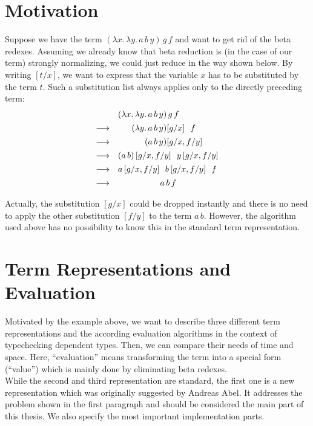 \documentclass[12pt, a4paper, titlepage]{article}
\newcommand{\sspace}{\,}
\newcommand{\lspace}{\ \,}
\newcommand{\shspace}{\vspace{1ex}}
\newcommand{\la}{\lambda}
\newcommand{\ApA}[2]{#1 \sspace #2}
\newcommand{\LaA}[2]{\la {#1}. \sspace #2}
\newcommand{\sub}[2]{\left[ #1 / #2 \right]}
\newcommand{\subs}[4]{\left[ #1 / #2 , #3 / #4 \right]}
\newcommand{\re}{\longrightarrow}
\let\stdsection\section
\renewcommand\section{\newpage\stdsection}
\begin{document}
\thispagestyle{empty}
\tableofcontents
\clearpage

\setcounter{page}{1}

\section{Motivation}

Suppose we have the term $(\LaA x {\LaA y {\ApA{\ApA a b} y}}) \sspace g \sspace f$ and want to get rid of the beta redexes. Assuming we already know that beta reduction is (in the case of our term) strongly normalizing, we could just reduce in the way shown below. By writing $\sub t x$, we want to express that the variable $x$ has to be substituted by the term $t$. Such a substitution list always applies only to the directly preceding term:
\[
\begin{array}{lr@{}l}
\shspace &(\LaA x {\LaA y {\ApA{\ApA a b} y}}) & \sspace g \sspace f \\ 
\shspace\re &(\LaA y {\ApA{\ApA a b} y}) & \sub g x \lspace f \\ 
\shspace\re &      (\ApA{\ApA a b} y) & \subs g x f y \\ 
\shspace\re &      \multicolumn 2 l {(a\sspace b)\subs g x f y \lspace y\subs g x f y} \\ 
\shspace\re &      \multicolumn 2 l {a\subs g x f y \lspace b\subs g x f y \lspace f} \\ 
\shspace\re &      \multicolumn 2 {c} {a \sspace b \sspace f}  \\ 
\end{array}
\]
Actually, the substitution $\sub g x$ could be dropped instantly and there is no need to apply the other substitution $\sub f y$ to the term $\ApA a b$. However, the algorithm used above has no possibility to know this in the standard term representation.


\section{Term Representations and Evaluation}\label{mainsec}

Motivated by the example above, we want to describe three different term representations and the according evaluation 
algorithms in the context of typechecking dependent types. Then, we can compare their needs of time and space. 
Here, ``evaluation'' means transforming the term into a special form (``value'') which is mainly done by eliminating beta redexes.\\
While the second and third representation are standard,
the first one is a new representation which was originally suggested by Andreas Abel. It addresses the problem shown in the first paragraph and should be considered the main part of this thesis. We also specify the most important implementation parts. 
\end{document}
